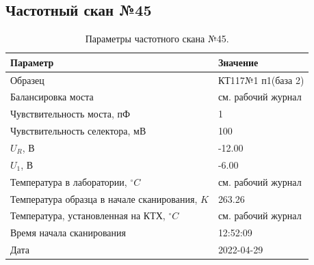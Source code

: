\subsection{Частотный скан №45}
\begin{table}[!ht]
    \centering
    \caption{Параметры частотного скана №45.}
    \begin{tabular}{|l|l|}
        \hline
        Параметр                                       & Значение                  \\ \hline
        Образец                                        & КТ117№1 п1(база 2)        \\ \hline
        Балансировка моста                             & см. рабочий журнал        \\ \hline
        Чувствительность моста, пФ                     & 1                         \\ \hline
        Чувствительность селектора, мВ                 & 100                       \\ \hline
        $U_R$, В                                       & -12.00                    \\ \hline
        $U_1$, В                                       & -6.00                     \\ \hline
        Температура в лаборатории, $^\circ C$          & см. рабочий журнал        \\ \hline
        Температура образца в начале сканирования, $K$ & 263.26                    \\ \hline
        Температура, установленная на КТХ, $^\circ C$  & см. рабочий журнал        \\ \hline
        Время начала сканирования                      & 12:52:09                  \\ \hline
        Дата                                           & 2022-04-29                \\ \hline
    \end{tabular}
    \label{table:frequency_scan_45}
\end{table}

